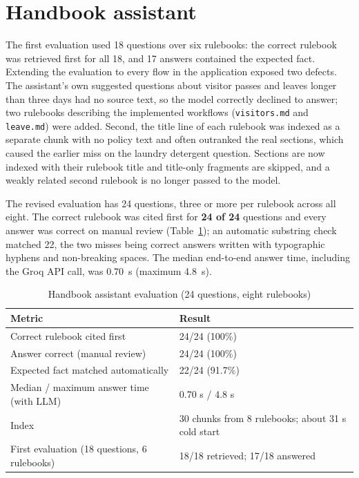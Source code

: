 \documentclass[12pt,a4paper,oneside]{report}
\newcommand{\head}{\rowcolor{headblue}}
\begin{document}
\section{Handbook assistant}
The first evaluation used 18 questions over six rulebooks: the correct rulebook was retrieved first for all 18, and
17 answers contained the expected fact. Extending the evaluation to every flow in the application exposed two
defects. The assistant's own suggested questions about visitor passes and leaves longer than three days had no
source text, so the model correctly declined to answer; two rulebooks describing the implemented workflows
(\texttt{visitors.md} and \texttt{leave.md}) were added. Second, the title line of each rulebook was indexed as a
separate chunk with no policy text and often outranked the real sections, which caused the earlier miss on the
laundry detergent question. Sections are now indexed with their rulebook title and title-only fragments are skipped,
and a weakly related second rulebook is no longer passed to the model.

The revised evaluation has 24 questions, three or more per rulebook across all eight. The correct rulebook was cited
first for \textbf{24 of 24} questions and every answer was correct on manual review (Table~\ref{tab:rag}); an
automatic substring check matched 22, the two misses being correct answers written with typographic hyphens and
non-breaking spaces. The median end-to-end answer time, including the Groq API call, was 0.70~s (maximum 4.8~s).

\begin{table}[!htbp]\centering\small
\caption{Handbook assistant evaluation (24 questions, eight rulebooks)}\label{tab:rag}
\begin{tabular}{p{3.0in}l}
\toprule\head \textbf{Metric} & \textbf{Result}\\\midrule
Correct rulebook cited first & 24/24 (100\%)\\
Answer correct (manual review) & 24/24 (100\%)\\
Expected fact matched automatically & 22/24 (91.7\%)\\
Median / maximum answer time (with LLM) & 0.70 s / 4.8 s\\
Index & 30 chunks from 8 rulebooks; about 31 s cold start\\
First evaluation (18 questions, 6 rulebooks) & 18/18 retrieved; 17/18 answered\\
\bottomrule
\end{tabular}
\end{table}
\end{document}
